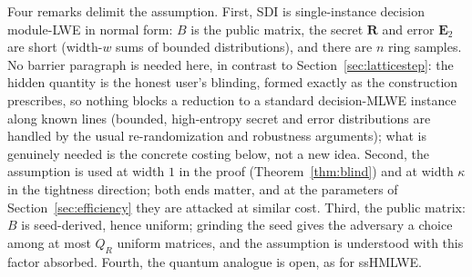 \documentclass[11pt]{article}
\begin{document}
Four remarks delimit the assumption.  First, SDI is single-instance decision
module-LWE in normal form: $B$ is the public matrix, the secret $\mathbf R$
and error $\mathbf E_2$ are short (width-$w$ sums of bounded distributions),
and there are $n$ ring samples.  No barrier paragraph is needed here, in
contrast to Section~\ref{sec:latticestep}: the hidden quantity is the honest
user's blinding, formed exactly as the construction prescribes, so nothing
blocks a reduction to a standard decision-MLWE instance along known lines
(bounded, high-entropy secret and error distributions are handled by the
usual re-randomization and robustness arguments); what is genuinely needed
is the concrete costing below, not a new idea.  Second, the assumption is
used at width $1$ in the proof (Theorem~\ref{thm:blind}) and at width
$\kappa$ in the tightness direction; both ends matter, and at the parameters
of Section~\ref{sec:efficiency} they are attacked at similar cost.  Third,
the public matrix: $B$ is seed-derived, hence uniform; grinding the seed
gives the adversary a choice among at most $Q_R$ uniform matrices, and the
assumption is understood with this factor absorbed.  Fourth, the quantum
analogue is open, as for ssHMLWE.
\end{document}
